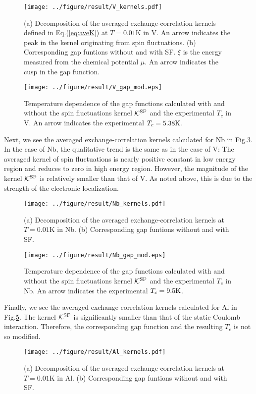 %
\begin{figure}[h]
	\centering
	\texttt{[image: ../figure/result/V\_kernels.pdf]}
	\caption{(a) Decomposition of the averaged exchange-correlation kernels defined in 
		Eq.(\ref{eq:aveK}) at $T=0.01$K in V. An arrow indicates the peak in the kernel
		originating from spin fluctuations.
		(b) Corresponding gap funtions without 
	and with SF. $\xi$ is the energy measured from the chemical potential $\mu$. An arrow
indicates the cusp in the gap function.}
	\label{fig:Vaveker}
\end{figure}
%
\begin{figure}[h]
	\centering
	\texttt{[image: ../figure/result/V\_gap\_mod.eps]}
	\caption{Temperature dependence of the gap functions calculated with and without 
		the spin fluctuations kernel $\mathcal K^{\rm SF}$ and the experimental $T_c$ in V.
		An arrow indicates the experimental $T_c = 5.38{\rm K}$.}
	\label{fig:VgapT}
\end{figure}
%

Next, we see the averaged exchange-correlation kernels calculated for Nb in Fig.\ref{fig:Nbaveker}.
In the case of Nb, the qualitative trend is the same as in the case of V: The averaged kernel of spin fluctuations
is nearly positive constant in low energy region and reduces to zero in high energy region.
However, the magnitude of the kernel $\mathcal K^{\rm SF}$ is relatively smaller than that of V.
As noted above, this is due to the strength of the electronic localization.
%
\begin{figure}[h]
	\centering
	\texttt{[image: ../figure/result/Nb\_kernels.pdf]}
	\caption{(a) Decomposition of the averaged exchange-correlation kernels
		at $T=0.01$K in Nb. (b) Corresponding gap funtions without 
	and with SF.}
	\label{fig:Nbaveker}
\end{figure}
%
\begin{figure}[h]
	\centering
	\texttt{[image: ../figure/result/Nb\_gap\_mod.eps]}
	\caption{Temperature dependence of the gap functions calculated with and without 
		the spin fluctuations kernel $\mathcal K^{\rm SF}$ and the experimental $T_c$ in Nb.
		An arrow indicates the experimental $T_c = 9.5{\rm K}$.}
	\label{fig:NbgapT}
\end{figure}

Finally, we see the averaged exchange-correlation kernels calculated for Al in Fig.\ref{fig:Alaveker}.
The kernel $\mathcal K^{\rm SF}$ is significantly smaller than that of the static Coulomb interaction.
Therefore, the corresponding gap function and the resulting $T_c$ is not so modified.
%
%
\begin{figure}[h]
	\centering
	\texttt{[image: ../figure/result/Al\_kernels.pdf]}
	\caption{(a) Decomposition of the averaged exchange-correlation kernels
		at $T=0.01$K in Al. (b) Corresponding gap funtions without 
	and with SF.}
	\label{fig:Alaveker}
\end{figure}
%


